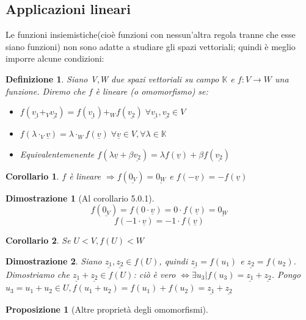 \documentclass[12pt]{article}
\newenvironment{para}{\begin{adjustwidth}{13mm}{}}{\end{adjustwidth}}
\newtheorem{Definizione}{Definizione}[subsection]
\newtheorem{Corollario}{Corollario}[subsection]
\newtheorem{Proposizione}{Proposizione}[subsection]
\newtheorem{Dimostrazione}{Dimostrazione}[subsection]
\begin{document}
\begin{para}
\section{Applicazioni lineari}
Le funzioni insiemistiche(cioè funzioni con nessun'altra regola tranne che esse siano funzioni) non sono adatte a studiare gli spazi vettoriali; quindi è meglio imporre alcune condizioni:
\begin{Definizione}
    Siano V,W due spazi vettoriali su campo $\mathbb{K}$ e $f:V\rightarrow W$ una funzione. Diremo che $f$ è lineare (o omomorfismo) se:
    \begin{itemize}
        \item $f(\underline{v_1}+_{V}\underline{v_2}) = f(\underline{v_1}) +_{W}f(\underline{v_2}) \; \forall \underline{v_1},\underline{v_2} \in V$
        \item $f(\lambda \cdot_{V} \underline{v}) = \lambda \cdot_{W} f(\underline{v}) \; \forall \underline{v} \in V, \forall \lambda \in \mathbb{K}$
        \item Equivalentemenente $f(\lambda \underline{v} + \beta \underline{v_2}) = \lambda f( \underline{v}) + \beta f( \underline{v_2})$
    \end{itemize}
\end{Definizione}
\begin{Corollario}
    $f$ è lineare $\Rightarrow f(\underline{0_V}) = \underline{0_W}$ e $f(-\underline{v}) = -f(\underline{v})$
\end{Corollario}
\begin{Dimostrazione}[Al corollario 5.0.1]
   $$ f(\underline{0_V}) = f(0 \cdot \underline{v}) = 0 \cdot f(\underline{v}) = \underline{0_W}$$
   $$ f(-1 \cdot \underline{v}) = -1 \cdot f(\underline{v})$$
\end{Dimostrazione}
\begin{Corollario}
    Se $U < V, f(U) < W$
\end{Corollario}
\begin{Dimostrazione}
    Siano $\underline{z_1}, \underline{z_2} \in f(U)$, quindi $\underline{z_1} = f(u_1)$ e $\underline{z_2} = f(u_2)$. Dimostriamo che $\underline{z_1} + \underline{z_2} \in f(U)$: ciò è vero $\Leftrightarrow \exists u_3|f(u_3)=\underline{z_1}+\underline{z_2}$. \newline
    Pongo $u_3 = u_1 + u_2 \in U, f(u_1+u_2) = f(u_1)+f(u_2)=\underline{z_1}+\underline{z_2}$
\end{Dimostrazione}
\begin{Proposizione}[Altre proprietà degli omomorfismi]

\end{Proposizione}
\end{para}
\end{document}
